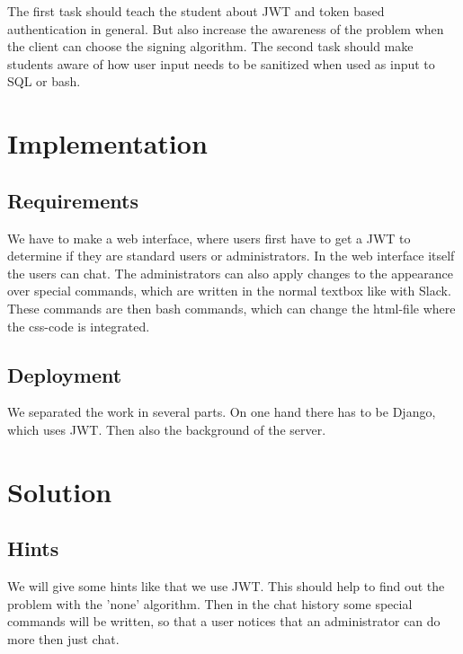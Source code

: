 \documentclass[12pt,a4paper]{article}
\begin{document}
The first task should teach the student about JWT and token based authentication in general. But also increase the awareness of the problem when the client can choose the signing algorithm. %
The second task should make students aware of how user input needs to be sanitized when used as input to SQL or bash. %

\section{Implementation}
\subsection{Requirements}
We have to make a web interface, where users first have to get a JWT to determine if they are standard users or administrators. In the web interface itself the users can chat. The administrators can also apply changes to the appearance over special commands, which are written in the normal textbox like with Slack. These commands are then bash commands, which can change the html-file where the css-code is integrated.
\subsection{Deployment}
We separated the work in several parts. On one hand there has to be Django, which uses JWT. Then also the background of the server.

\section{Solution}

\subsection{Hints}
We will give some hints like that we use JWT. This should help to find out the problem with the 'none' algorithm. Then in the chat history some special commands will be written, so that a user notices that an administrator can do more then just chat.
\end{document}
